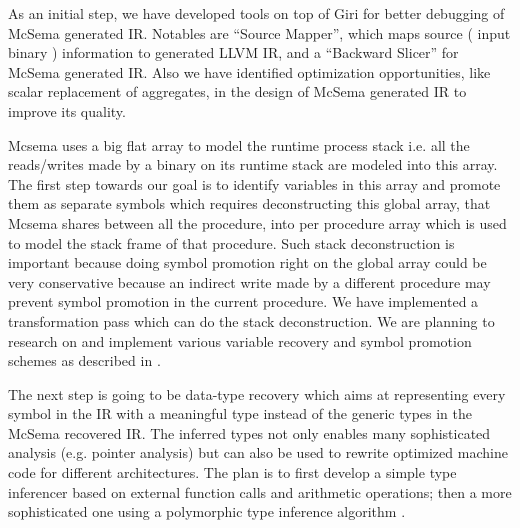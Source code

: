 \documentclass[10pt,twoside]{article}
\begin{document}
As an initial step, we have developed tools \cite{SourceMapper} on top of
Giri\cite{GIRI-ASPLOS-2013} for better debugging of McSema generated IR.
Notables are ``Source Mapper'', which maps source ( input binary ) information
to generated LLVM IR, and a ``Backward Slicer'' for McSema generated IR. Also we
have identified optimization opportunities, like scalar replacement of
aggregates, in the design of McSema generated IR to improve its quality. 

Mcsema uses a big flat array to model the runtime process stack i.e. all the
reads/writes made by a binary on its runtime stack are modeled into this array.
The first step towards our goal is to identify variables in this array and
promote them as separate symbols which requires deconstructing this global
array, that Mcsema shares between all the procedure, into per procedure array
which is used to model the stack frame of that procedure.  Such stack
deconstruction is important because doing symbol promotion right on the global
array could be very conservative because an indirect write made by a different
procedure may prevent symbol promotion in the current procedure.  We have
implemented a transformation pass which can do the stack deconstruction. We are
planning to research on and implement various variable recovery and symbol
promotion schemes as described in \cite{SECONDWRITE-EUROSYS-2013,
DIVINE-VMCAI-2007}.

The next step is going to be data-type recovery which aims at representing every
symbol in the IR with a meaningful type instead of the generic types in the
McSema recovered IR. The inferred types not only enables many sophisticated
analysis (e.g. pointer analysis) but can also be used to rewrite optimized
machine code for different architectures.  The plan is to first develop a
simple type inferencer based on external function calls and arithmetic
operations; then a more sophisticated one using a polymorphic type inference
algorithm \cite{POLYTYPEINFERENCE-PLDI-2016}.

\nocite{*}

\end{document}
